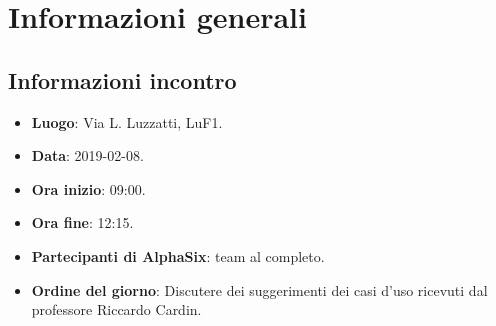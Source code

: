 \newcommand{\documento}{\VI}
\newcommand{\nomedocumentofisico}{VI\_2019-02-08.pdf}
\newcommand{\redazione}{\SG}
\newcommand{\verifica}{\LC}
\newcommand{\approvazione}{\TG}
\newcommand{\versione}{1.0.0}
\newcommand{\uso}{Interno}
\newcommand{\destinateTo}{\gruppo}
\newcommand{\datacreazione}{10 febbraio 2019}
\newcommand{\datamodifica}{12 febbraio 2019}
\newcommand{\stato}{Approvato}

\def\TABELLE{false}	%
\def\FIGURE{false} 	%






    

    	
    
    \section{Informazioni generali}
		\subsection{Informazioni incontro}
			\begin{itemize}
				\item \textbf{Luogo}: Via L. Luzzatti, LuF1.
				\item \textbf{Data}: 2019-02-08.
				\item \textbf{Ora inizio}: 09:00.
				\item \textbf{Ora fine}: 12:15.
				\item \textbf{Partecipanti di AlphaSix}: team al completo.
				\item \textbf{Ordine del giorno}: Discutere dei suggerimenti dei casi d'uso ricevuti dal professore Riccardo Cardin.
			\end{itemize}

